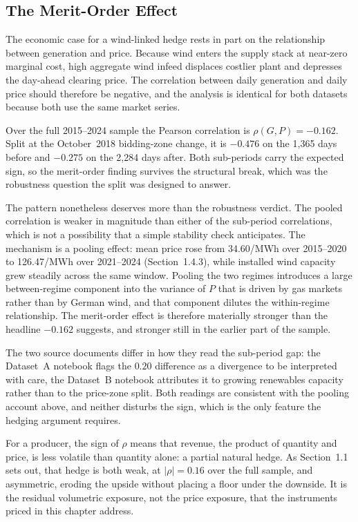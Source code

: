 \documentclass[11pt, a4paper, twoside]{article}
\begin{document}
\subsection{The Merit-Order Effect}
\label{sec:merit}

The economic case for a wind-linked hedge rests in part on the relationship between generation and price. Because wind enters the supply stack at near-zero marginal cost, high aggregate wind infeed displaces costlier plant and depresses the day-ahead clearing price. The correlation between daily generation and daily price should therefore be negative, and the analysis is identical for both datasets because both use the same market series.

Over the full 2015--2024 sample the Pearson correlation is $\rho(G,P) = -0.162$. Split at the October~2018 bidding-zone change, it is $-0.476$ on the 1{,}365 days before and $-0.275$ on the 2{,}284 days after. Both sub-periods carry the expected sign, so the merit-order finding survives the structural break, which was the robustness question the split was designed to answer.

The pattern nonetheless deserves more than the robustness verdict. The pooled correlation is weaker in magnitude than either of the sub-period correlations, which is not a possibility that a simple stability check anticipates. The mechanism is a pooling effect: mean price rose from \texteuro{}34.60/MWh over 2015--2020 to \texteuro{}126.47/MWh over 2021--2024 (Section~1.4.3), while installed wind capacity grew steadily across the same window. Pooling the two regimes introduces a large between-regime component into the variance of $P$ that is driven by gas markets rather than by German wind, and that component dilutes the within-regime relationship. The merit-order effect is therefore materially stronger than the headline $-0.162$ suggests, and stronger still in the earlier part of the sample.

The two source documents differ in how they read the sub-period gap: the Dataset~A notebook flags the $0.20$ difference as a divergence to be interpreted with care, the Dataset~B notebook attributes it to growing renewables capacity rather than to the price-zone split. Both readings are consistent with the pooling account above, and neither disturbs the sign, which is the only feature the hedging argument requires.

For a producer, the sign of $\rho$ means that revenue, the product of quantity and price, is less volatile than quantity alone: a partial natural hedge. As Section~1.1 sets out, that hedge is both weak, at $|\rho| = 0.16$ over the full sample, and asymmetric, eroding the upside without placing a floor under the downside. It is the residual volumetric exposure, not the price exposure, that the instruments priced in this chapter address.
\end{document}
